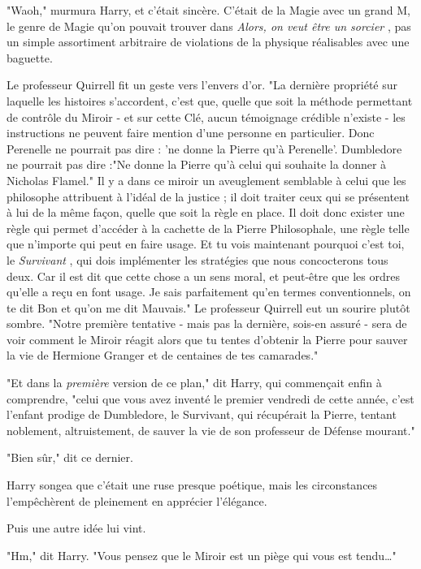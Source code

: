 "Waoh," murmura Harry, et c'était sincère. C'était de la Magie avec un grand M, le genre de Magie qu'on pouvait trouver dans \emph{Alors, on veut être un sorcier} , pas un simple assortiment arbitraire de violations de la physique réalisables avec une baguette.

Le professeur Quirrell fit un geste vers l'envers d'or. "La dernière propriété sur laquelle les histoires s'accordent, c'est que, quelle que soit la méthode permettant de contrôle du Miroir - et sur cette Clé, aucun témoignage crédible n'existe - les instructions ne peuvent faire mention d'une personne en particulier. Donc Perenelle ne pourrait pas dire : 'ne donne la Pierre qu'à Perenelle'. Dumbledore ne pourrait pas dire :"Ne donne la Pierre qu'à celui qui souhaite la donner à Nicholas Flamel." Il y a dans ce miroir un aveuglement semblable à celui que les philosophe attribuent à l'idéal de la justice ; il doit traiter ceux qui se présentent à lui de la même façon, quelle que soit la règle en place. Il doit donc exister une règle qui permet d'accéder à la cachette de la Pierre Philosophale, une règle telle que n'importe qui peut en faire usage. Et tu vois maintenant pourquoi c'est toi, le \emph{Survivant} , qui dois implémenter les stratégies que nous concocterons tous deux. Car il est dit que cette chose a un sens moral, et peut-être que les ordres qu'elle a reçu en font usage. Je sais parfaitement qu'en termes conventionnels, on te dit Bon et qu'on me dit Mauvais." Le professeur Quirrell eut un sourire plutôt sombre. "Notre première tentative - mais pas la dernière, sois-en assuré - sera de voir comment le Miroir réagit alors que tu tentes d'obtenir la Pierre pour sauver la vie de Hermione Granger et de centaines de tes camarades."

"Et dans la \emph{première}  version de ce plan," dit Harry, qui commençait enfin à comprendre, "celui que vous avez inventé le premier vendredi de cette année, c'est l'enfant prodige de Dumbledore, le Survivant, qui récupérait la Pierre, tentant noblement, altruistement, de sauver la vie de son professeur de Défense mourant."

"Bien sûr," dit ce dernier.

Harry songea que c'était une ruse presque poétique, mais les circonstances l'empêchèrent de pleinement en apprécier l'élégance.

Puis une autre idée lui vint.

"Hm," dit Harry. "Vous pensez que le Miroir est un piège qui vous est tendu…"

